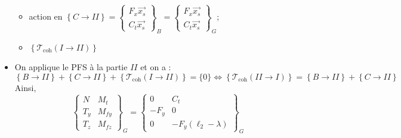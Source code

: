 \documentclass[10pt,fleqn]{article} %
\begin{document}
\begin{multicols}{2}
\begin{itemize}
\begin{itemize}
\item action en $\left\{ C \rightarrow II \right\}= \begin{Bmatrix} F_x\overrightarrow{x_s}\\
C_t\overrightarrow{x_s}\end{Bmatrix}_B= \begin{Bmatrix} F_x\overrightarrow{x_s}\\
C_t\overrightarrow{x_s}\end{Bmatrix}_G$;
\item $\left\{ \mathcal{T}_{\text{coh}} \left(I \rightarrow II\right) \right\}$
\end{itemize}
\item On applique le PFS à la partie $II$ et on a : 
$$
\left\{ B\rightarrow II \right\} + \left\{ C\rightarrow II \right\}
+\left\{ \mathcal{T}_{\text{coh}} \left(I \rightarrow II\right) \right\} = \{0\}
\Leftrightarrow
\left\{ \mathcal{T}_{\text{coh}} \left(II \rightarrow I\right) \right\}  = \left\{ B\rightarrow II \right\} + \left\{ C\rightarrow II \right\}
$$ 
Ainsi, 
$$
\begin{Bmatrix} 
N & M_t \\
T_y & M_{fy} \\
T_z & M_{fz} 
\end{Bmatrix}_G
=
\begin{Bmatrix} 
0 & C_t \\
 -F_y& 0 \\
0 &  -F_y\left( \ell_2 - \lambda \right) 
\end{Bmatrix}_G
$$
\end{itemize}



\end{multicols}
\end{document}
